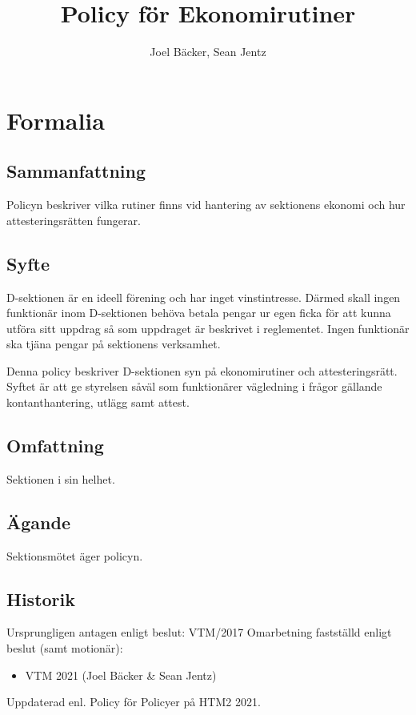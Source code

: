 \documentclass{dsekprotokoll}
\title{Policy för Ekonomirutiner}
\author{Joel Bäcker, Sean Jentz}
\begin{document}
\maketitle
\section{Formalia}
\subsection{Sammanfattning}
Policyn beskriver vilka rutiner finns vid hantering av sektionens ekonomi och hur attesteringsrätten fungerar.
\subsection{Syfte}
D-sektionen är en ideell förening och har inget vinstintresse. Därmed skall ingen funktionär inom D-sektionen behöva betala pengar ur egen ficka för att kunna utföra sitt uppdrag så som uppdraget är beskrivet i reglementet. Ingen funktionär ska tjäna pengar på sektionens verksamhet.

\par Denna policy beskriver D-sektionen syn på ekonomirutiner och attesteringsrätt. Syftet är att ge styrelsen såväl som funktionärer vägledning i frågor gällande kontanthantering, utlägg samt attest.
\subsection{Omfattning}
Sektionen i sin helhet.
\subsection{Ägande}
Sektionsmötet äger policyn.
\subsection{Historik}
Ursprungligen antagen enligt beslut: VTM/2017
Omarbetning fastställd enligt beslut (samt motionär):
\begin{itemize}
    \item VTM 2021 (Joel Bäcker \& Sean Jentz)
\end{itemize}
Uppdaterad enl. Policy för Policyer på HTM2 2021.


\end{document}
